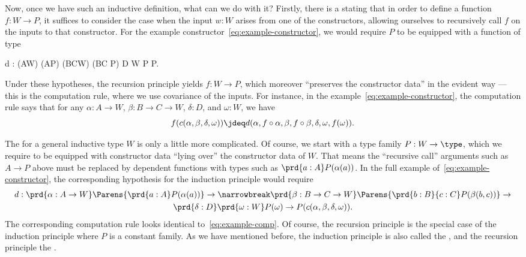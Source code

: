 %
Now, once we have such an inductive definition, what can we do with it?
Firstly, there is a  stating that in order to define a function $f:W\to P$, it suffices to consider the case when the input $w:W$ arises from one of the constructors, allowing ourselves to recursively call $f$ on the inputs to that constructor.
For the example constructor~\eqref{eq:example-constructor}, we would require $P$ to be equipped with a function of type
\begin{narrowmultline}\label{eq:example-rechyp}
  d : (A\to W) \to (A\to P) \to (B\to C\to W) \to
  \narrowbreak
  (B\to C \to P) \to D \to W \to P \to P.
\end{narrowmultline}
Under these hypotheses, the recursion principle yields $f:W\to P$, which moreover ``preserves the constructor data'' in the evident way --- this is the computation rule, where we use covariance of the inputs.
%
For instance, in the example~\eqref{eq:example-constructor}, the computation rule says that for any $\alpha:A\to W$, $\beta:B\to C\to W$, $\delta:D$, and $\omega:W$, we have
\begin{equation}
  f(c(\alpha,\beta,\delta,\omega)) \jdeq d(\alpha,f\circ \alpha,\beta, f\circ \beta, \delta, \omega,f(\omega)).\label{eq:example-comp}
\end{equation}

%
The  for a general inductive type $W$ is only a little more complicated.
Of course, we start with a type family $P:W\to\type$, which we require to be equipped with constructor data ``lying over'' the constructor data of $W$.
That means the ``recursive call'' arguments such as $A\to P$ above must be replaced by dependent functions with types such as $\prd{a:A} P(\alpha(a))$.
In the full example of~\eqref{eq:example-constructor}, the corresponding hypothesis for the induction principle would require
\begin{multline}\label{eq:example-indhyp}
d : \prd{\alpha:A\to W}\Parens{\prd{a:A} P(\alpha(a))} \to \narrowbreak
\prd{\beta:B\to C\to W} \Parens{\prd{b:B}{c:C} P(\beta(b,c))} \to\\
\prd{\delta:D}
\prd{\omega:W} P(\omega) \to
P(c(\alpha,\beta,\delta,\omega)).
\end{multline}
The corresponding computation rule looks identical to~\eqref{eq:example-comp}.
Of course, the recursion principle is the special case of the induction principle where $P$ is a constant family.
As we have mentioned before, the induction principle is also called the , and the recursion principle the .

